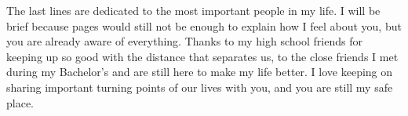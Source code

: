 \documentclass[12pt,a4paper,openright,twoside]{book}
\begin{document}
\begin{acknowledgements}
The last lines are dedicated to the most important people in my life. I will be brief because pages would still not be enough to explain how I feel about you, but you are already aware of everything. Thanks to my high school friends for keeping up so good with the distance that separates us, to the close friends I met during my Bachelor's and are still here to make my life better. I love keeping on sharing important turning points of our lives with you, and you are still my safe place. 

\end{acknowledgements}
\end{document}
